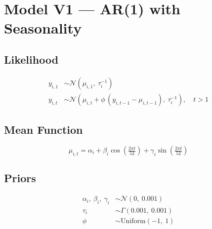 \documentclass{article}
\begin{document}
\section*{Model V1 --- AR(1) with Seasonality}

\subsection*{Likelihood}

\begin{align}
  y_{i,1} &\sim \mathcal{N}(\mu_{i,1},\ \tau_i^{-1}) \\[6pt]
  y_{i,t} &\sim \mathcal{N}\left(\mu_{i,t} + \phi\,(y_{i,t-1} - \mu_{i,t-1}),\ \tau_i^{-1}\right), \quad t > 1
\end{align}

\subsection*{Mean Function}

\begin{equation}
  \mu_{i,t} = \alpha_i
    + \beta_i \cos\left(\tfrac{2\pi t}{52}\right)
    + \gamma_i \sin\left(\tfrac{2\pi t}{52}\right)
\end{equation}

\subsection*{Priors}

\begin{align}
  \alpha_i,\ \beta_i,\ \gamma_i &\sim \mathcal{N}(0,\ 0.001) \\
  \tau_i &\sim \Gamma(0.001,\ 0.001) \\
  \phi &\sim \mathrm{Uniform}(-1,\ 1)
\end{align}
\end{document}
